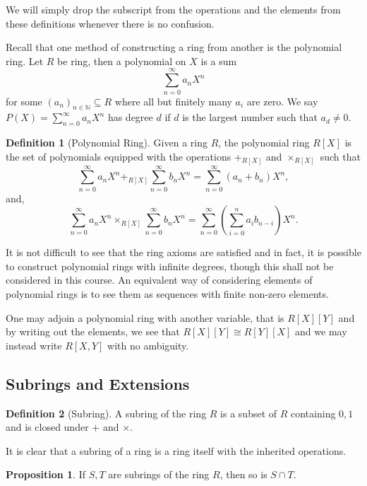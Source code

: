 \documentclass[]{article}
\theoremstyle{definition}
\theoremstyle{definition}
\newtheorem{definition}{Definition}[section]
\newtheorem{proposition}{Proposition}[section]
\begin{document}
We will simply drop the subscript from the operations and the elements from 
these definitions whenever there is no confusion. 

Recall that one method of constructing a ring from another is the polynomial 
ring. Let \(R\) be ring, then a polynomial on \(X\) is a sum 
\[\sum_{n = 0}^\infty a_n X^n\]
for some \((a_n)_{n \in \mathbb{N}} \subseteq R\) where all but finitely 
many \(a_i\) are zero. We say \(P(X) = \sum_{n = 0}^\infty a_n X^n\) has 
degree \(d\) if \(d\) is the largest number such that \(a_d \neq 0\).

\begin{definition}[Polynomial Ring]
  Given a ring \(R\), the polynomial ring \(R[X]\) is the set of polynomials 
  equipped with the operations \(+_{R[X]}\) and \(\times_{R[X]}\) such that 
  \[\sum_{n = 0}^\infty a_n X^n +_{R[X]} \sum_{n = 0}^\infty b_n X^n = 
    \sum_{n = 0}^\infty (a_n + b_n) X^n,\]
  and,
  \[\sum_{n = 0}^\infty a_n X^n \times_{R[X]} \sum_{n = 0}^\infty b_n X^n =
    \sum_{n = 0}^\infty \left(\sum_{i = 0}^n a_i b_{n - i} \right) X^n.\]
\end{definition}

It is not difficult to see that the ring axioms are satisfied and in fact, it 
is possible to construct polynomial rings with infinite degrees, though this 
shall not be considered in this course. An equivalent way of considering elements 
of polynomial rings is to see them as sequences with finite non-zero elements. 

One may adjoin a polynomial ring with another variable, that is 
\(R[X][Y]\) and by writing out the elements, we see that \(R[X][Y] \cong R[Y][X]\) 
and we may instead write \(R[X, Y]\) with no ambiguity. 

\subsection{Subrings and Extensions}

\begin{definition}[Subring]
  A subring of the ring \(R\) is a subset of \(R\) containing \(0, 1\) and is 
  closed under \(+\) and \(\times\).
\end{definition}

It is clear that a subring of a ring is a ring itself with the inherited 
operations. 

\begin{proposition}
  If \(S, T\) are subrings of the ring \(R\), then so is \(S \cap T\).
\end{proposition}
\end{document}
